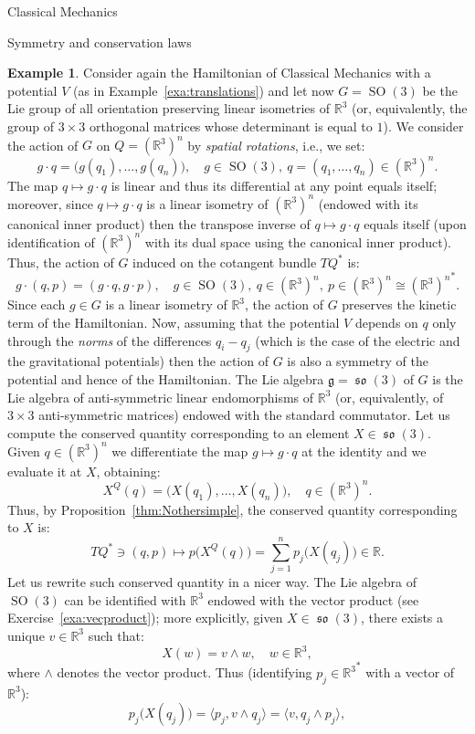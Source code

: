 \documentclass[oneside,a4paper,11pt]{amsbook}
\newcommand{\R}{\mathds R}
\DeclareMathOperator{\SO}{SO}
\DeclareMathOperator{\so}{\mathfrak{so}}
\theoremstyle{remark}\newtheorem{exercise}{Exercise}[chapter]
\theoremstyle{plain}\newtheorem{teo}{Theorem}[section]
\theoremstyle{plain}\newtheorem{lem}[teo]{Lemma}
\theoremstyle{plain}\newtheorem{prop}[teo]{Proposition}
\theoremstyle{plain}\newtheorem{cor}[teo]{Corollary}
\theoremstyle{definition}\newtheorem{defin}[teo]{Definition}
\theoremstyle{remark}\newtheorem{rem}[teo]{Remark}
\theoremstyle{definition}\newtheorem{notation}[teo]{Notation}
\theoremstyle{definition}\newtheorem{convention}[teo]{Convention}
\theoremstyle{definition}\newtheorem{example}[teo]{Example}
\numberwithin{section}{chapter}
\numberwithin{equation}{section}
\begin{document}
\begin{chapter}{Classical Mechanics}
\begin{section}{Symmetry and conservation laws}
\begin{example}\label{exa:angmom}
Consider again the Hamiltonian of Classical Mechanics with a potential $V$ (as in Example~\ref{exa:translations}) and let now $G=\SO(3)$ be the Lie group of all orientation
preserving linear isometries of $\R^3$ (or, equivalently, the group of $3\times3$ orthogonal matrices whose determinant is equal to $1$).
We consider the action of $G$ on $Q=(\R^3)^n$ by {\em spatial rotations}, i.e., we set:
\[g\cdot q=\big(g(q_1),\ldots,g(q_n)\big),\quad g\in\SO(3),\ q=(q_1,\ldots,q_n)\in(\R^3)^n.\]
The map $q\mapsto g\cdot q$ is linear and thus its differential at any point equals itself; moreover, since $q\mapsto g\cdot q$ is a linear isometry of
$(\R^3)^n$ (endowed with its canonical inner product) then the transpose inverse of $q\mapsto g\cdot q$ equals itself (upon identification of
$(\R^3)^n$ with its dual space using the canonical inner product). Thus, the action of $G$ induced on the cotangent bundle $TQ^*$ is:
\[g\cdot(q,p)=(g\cdot q,g\cdot p),\quad g\in\SO(3),\ q\in(\R^3)^n,\ p\in(\R^3)^n\cong{(\R^3)^n}^*.\]
Since each $g\in G$ is a linear isometry of $\R^3$, the action of $G$ preserves the kinetic term of the Hamiltonian. Now, assuming that the potential
$V$ depends on $q$ only through the {\em norms\/} of the differences $q_i-q_j$ (which is the case of the electric and the gravitational potentials) then the action of
$G$ is also a symmetry of the potential and hence of the Hamiltonian. The Lie algebra $\mathfrak g=\so(3)$ of $G$ is the Lie algebra of anti-symmetric
linear endomorphisms of $\R^3$ (or, equivalently, of $3\times3$ anti-symmetric matrices) endowed with the standard commutator. Let us compute
the conserved quantity corresponding to an element $X\in\so(3)$. Given $q\in(\R^3)^n$ we differentiate the map $g\mapsto g\cdot q$ at the identity
and we evaluate it at $X$, obtaining:
\[X^Q(q)=\big(X(q_1),\ldots,X(q_n)\big),\quad q\in(\R^3)^n.\]
Thus, by Proposition~\ref{thm:Nothersimple}, the conserved quantity corresponding to $X$ is:
\[TQ^*\ni(q,p)\longmapsto p\big(X^Q(q)\big)=\sum_{j=1}^np_j\big(X(q_j)\big)\in\R.\]
Let us rewrite such conserved quantity in a nicer way. The Lie algebra of $\SO(3)$ can be identified with $\R^3$ endowed with the vector product
(see Exercise~\ref{exa:vecproduct}); more explicitly, given $X\in\so(3)$, there exists a unique $v\in\R^3$ such that:
\[X(w)=v\wedge w,\quad w\in\R^3,\]
where $\wedge$ denotes the vector product. Thus (identifying $p_j\in{\R^3}^*$ with a vector of $\R^3$):
\[p_j\big(X(q_j)\big)=\langle p_j,v\wedge q_j\rangle=\langle v,q_j\wedge p_j\rangle,\]

\end{example}
\end{section}
\end{chapter}
\end{document}
